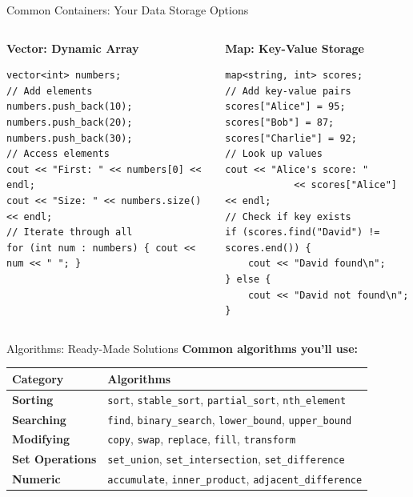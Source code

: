 \begin{frame}[fragile]{Common Containers: Your Data Storage Options}
	\begin{columns}
		\begin{column}{0.5\textwidth}
			\textbf{Vector: Dynamic Array}
			\begin{verbatim}
vector<int> numbers;
// Add elements
numbers.push_back(10);
numbers.push_back(20);
numbers.push_back(30);
// Access elements
cout << "First: " << numbers[0] << endl;
cout << "Size: " << numbers.size() << endl;
// Iterate through all
for (int num : numbers) { cout << num << " "; }
			\end{verbatim}
		\end{column}
		\begin{column}{0.5\textwidth}
			\textbf{Map: Key-Value Storage}
			\begin{verbatim}
map<string, int> scores;
// Add key-value pairs
scores["Alice"] = 95;
scores["Bob"] = 87;
scores["Charlie"] = 92;
// Look up values
cout << "Alice's score: "
            << scores["Alice"] << endl;
// Check if key exists
if (scores.find("David") != scores.end()) {
    cout << "David found\n";
} else {
    cout << "David not found\n";
}
			\end{verbatim}
		\end{column}
	\end{columns}
\end{frame}

\begin{frame}[fragile]{Algorithms: Ready-Made Solutions}
	\textbf{Common algorithms you'll use:}
	\begin{table}[]
		\begin{tabular}{|l|l|}
			\hline
			\textbf{Category}       & \textbf{Algorithms}                                                                  \\ \hline
			\textbf{Sorting}        & \texttt{sort}, \texttt{stable\_sort}, \texttt{partial\_sort}, \texttt{nth\_element}  \\ \hline
			\textbf{Searching}      & \texttt{find}, \texttt{binary\_search}, \texttt{lower\_bound}, \texttt{upper\_bound} \\ \hline
			\textbf{Modifying}      & \texttt{copy}, \texttt{swap}, \texttt{replace}, \texttt{fill}, \texttt{transform}    \\ \hline
			\textbf{Set Operations} & \texttt{set\_union}, \texttt{set\_intersection}, \texttt{set\_difference}            \\ \hline
			\textbf{Numeric}        & \texttt{accumulate}, \texttt{inner\_product}, \texttt{adjacent\_difference}          \\ \hline
		\end{tabular}
	\end{table}
\end{frame}

